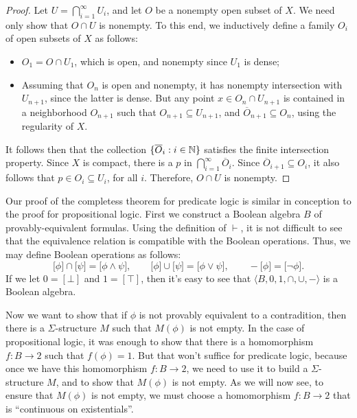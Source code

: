 \begin{proof} Let $U=\bigcap _{i=1}^{\infty}U_i$, and let $O$ be a
  nonempty open subset of $X$.  We need only show that $O\cap U$ is
  nonempty.  To this end, we inductively define a family $O_i$ of open
  subsets of $X$ as follows:
  \begin{itemize} 
  \item $O_1 =O\cap U_1$, which is open, and nonempty since $U_1$ is
    dense;
  \item Assuming that $O_n$ is open and nonempty, it has nonempty
    intersection with $U_{n+1}$, since the latter is dense.  But any
    point $x\in O_n\cap U_{n+1}$ is contained in a neighborhood
    $O_{n+1}$ such that $O_{n+1}\subseteq U_{n+1}$, and
    $\overline{O}_{n+1}\subseteq O_n$, using the regularity of $X$.
\end{itemize}
It follows then that the collection $\{ \overline{O}_i:i\in \mathbb N \}$
satisfies the finite intersection property.  Since $X$ is compact,
there is a $p$ in $\bigcap _{i=1}^{\infty}\overline{O}_i$.  Since
$\overline{O}_{i+1}\subseteq O_i$, it also follows that $p\in
O_i\subseteq U_i$, for all $i$.  Therefore, $O\cap U$ is nonempty.
\end{proof}

Our proof of the completess theorem for predicate logic is similar in
conception to the proof for propositional logic.  First we construct a
Boolean algebra $B$ of provably-equivalent formulas.  Using the
definition of $\vdash$, it is not difficult to see that the
equivalence relation is compatible with the Boolean operations.  Thus,
we may define Boolean operations as follows:
\[ {[}\phi ]\cap {[}\psi ] =  {[}\phi\wedge\psi ] ,\qquad {[}\phi
  ]\cup {[}\psi ] = {[}\phi\vee\psi ] , \qquad - {[}\phi ] = {[}\neg
  \phi ] . \] If we let $0=[\bot ]$ and $1=[\top ]$, then it's easy to
see that $\langle B,0,1,\cap ,\cup ,-\rangle $ is a Boolean algebra.

Now we want to show that if $\phi$ is not provably equivalent to a
contradition, then there is a $\Sigma$-structure $M$ such that
$M(\phi )$ is not empty.  In the case of propositional logic, it was
enough to show that there is a homomorphism $f:B\to 2$ such that
$f(\phi )=1$.  But that won't suffice for predicate logic, because
once we have this homomorphism $f:B\to 2$, we need to use it to build
a $\Sigma$-structure $M$, and to show that $M(\phi )$ is not empty.
As we will now see, to ensure that $M(\phi )$ is not empty, we must
choose a homomorphism $f:B\to 2$ that is ``continuous on
existentials''.


